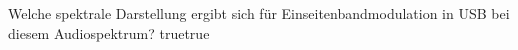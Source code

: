     {Welche spektrale Darstellung ergibt sich für Einseitenbandmodulation in USB bei diesem Audiospektrum?}
    {}
    {}
    {}
    {}
    {true}{true}
